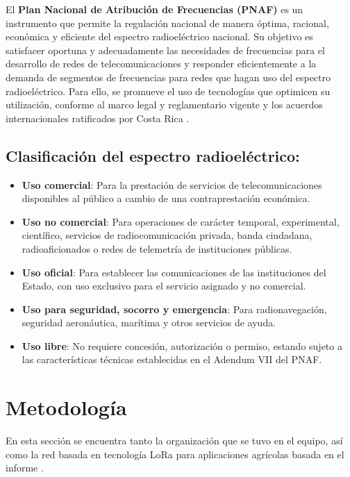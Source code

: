 \documentclass[conference]{IEEEtran}
\begin{document}
El \textbf{Plan Nacional de Atribución de Frecuencias (PNAF)} es un instrumento que permite la regulación nacional de manera óptima, racional, económica y eficiente del espectro radioeléctrico nacional. Su objetivo es satisfacer oportuna y adecuadamente las necesidades de frecuencias para el desarrollo de redes de telecomunicaciones y responder eficientemente a la demanda de segmentos de frecuencias para redes que hagan uso del espectro radioeléctrico. Para ello, se promueve el uso de tecnologías que optimicen su utilización, conforme al marco legal y reglamentario vigente y los acuerdos internacionales ratificados por Costa Rica \cite{PNAF}.

\vspace{0.1mm}

\subsection*{Clasificación del espectro radioeléctrico:}

\begin{itemize}
    \item \textbf{Uso comercial}: Para la prestación de servicios de telecomunicaciones disponibles al público a cambio de una contraprestación económica.
    \item \textbf{Uso no comercial}: Para operaciones de carácter temporal, experimental, científico, servicios de radiocomunicación privada, banda ciudadana, radioaficionados o redes de telemetría de instituciones públicas.
    \item \textbf{Uso oficial}: Para establecer las comunicaciones de las instituciones del Estado, con uso exclusivo para el servicio asignado y no comercial.
    \item \textbf{Uso para seguridad, socorro y emergencia}: Para radionavegación, seguridad aeronáutica, marítima y otros servicios de ayuda.
    \item \textbf{Uso libre}: No requiere concesión, autorización o permiso, estando sujeto a las características técnicas establecidas en el Adendum VII del PNAF.
\end{itemize}

\vspace{2mm}

\section{\textbf{Metodología}}
En esta sección se encuentra tanto la organización que se tuvo en el equipo, así como la red basada en tecnología LoRa para aplicaciones agrícolas basada en el informe \cite{paper}.
\end{document}
